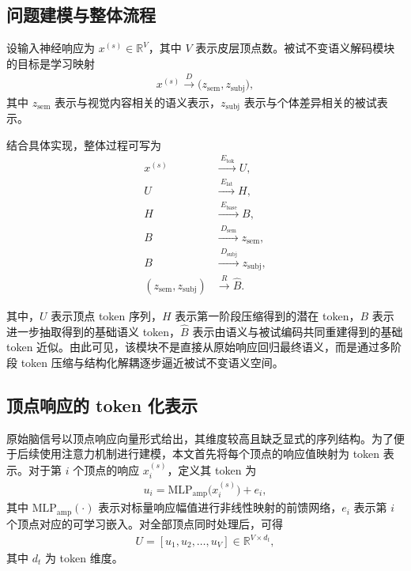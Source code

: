\subsection{问题建模与整体流程}

设输入神经响应为 $x^{(s)} \in \mathbb{R}^{V}$，其中 $V$ 表示皮层顶点数。被试不变语义解码模块的目标是学习映射
\begin{align}
  x^{(s)} \xrightarrow{\ D\ } \bigl(z_{\mathrm{sem}}, z_{\mathrm{subj}}\bigr),
\end{align}
其中 $z_{\mathrm{sem}}$ 表示与视觉内容相关的语义表示，$z_{\mathrm{subj}}$ 表示与个体差异相关的被试表示。

结合具体实现，整体过程可写为
\begin{align}
  x^{(s)} &\xrightarrow{\ E_{\mathrm{tok}}\ } U, \\
  U &\xrightarrow{\ E_{\mathrm{lat}}\ } H, \\
  H &\xrightarrow{\ E_{\mathrm{base}}\ } B, \\
  B &\xrightarrow{\ D_{\mathrm{sem}}\ } z_{\mathrm{sem}}, \\
  B &\xrightarrow{\ D_{\mathrm{subj}}\ } z_{\mathrm{subj}}, \\
  (z_{\mathrm{sem}}, z_{\mathrm{subj}}) &\xrightarrow{\ R\ } \hat{B}.
\end{align}

其中，$U$ 表示顶点 token 序列，$H$ 表示第一阶段压缩得到的潜在 token，$B$ 表示进一步抽取得到的基础语义 token，$\hat{B}$ 表示由语义与被试编码共同重建得到的基础 token 近似。由此可见，该模块不是直接从原始响应回归最终语义，而是通过多阶段 token 压缩与结构化解耦逐步逼近被试不变语义空间。

\subsection{顶点响应的 token 化表示}

原始脑信号以顶点响应向量形式给出，其维度较高且缺乏显式的序列结构。为了便于后续使用注意力机制进行建模，本文首先将每个顶点的响应值映射为 token 表示。对于第 $i$ 个顶点的响应 $x_i^{(s)}$，定义其 token 为
\begin{align}
  u_i = \mathrm{MLP}_{\mathrm{amp}}\bigl(x_i^{(s)}\bigr) + e_i,
\end{align}
其中 $\mathrm{MLP}_{\mathrm{amp}}(\cdot)$ 表示对标量响应幅值进行非线性映射的前馈网络，$e_i$ 表示第 $i$ 个顶点对应的可学习嵌入。对全部顶点同时处理后，可得
\begin{align}
  U = [u_1, u_2, \dots, u_V] \in \mathbb{R}^{V \times d_t},
\end{align}
其中 $d_t$ 为 token 维度。


